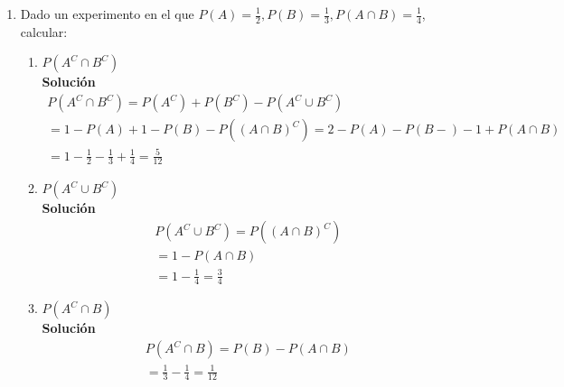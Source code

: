 \begin{enumerate}
    \item Dado un experimento en el que $P(A) = \frac{1}{2}, P(B) = \frac{1}{3}, P(A \cap B) = \frac{1}{4}$, calcular:
    \begin{enumerate}
        \item $P(A^C \cap B^C)$
        \\\textbf{Solución}
        \begin{gather*}
        P(A^C \cap B^C) = P(A^C) + P(B^C) - P(A^C \cup B^C) \\
        = 1 - P(A) + 1 - P(B) - P((A \cap B)^C) = 2 - P(A) - P(B-) - 1 + P(A \cap B) \\
        = 1 - \frac{1}{2} - \frac{1}{3} + \frac{1}{4} = \frac{5}{12}
        \end{gather*}
        
        \item $P(A^C \cup B^C)$
        \\\textbf{Solución}
        \begin{gather*}
        P(A^C \cup B^C) = P((A \cap B)^C) \\
        = 1 - P(A \cap B) \\
        = 1 - \frac{1}{4} = \frac{3}{4}
        \end{gather*}
        
        \item $P(A^C \cap B)$
        \\\textbf{Solución}
        \begin{gather*}
        P(A^C \cap B) = P(B) - P(A \cap B) \\
        = \frac{1}{3} - \frac{1}{4} = \frac{1}{12}
        \end{gather*}
        
    \end{enumerate}
    

\end{enumerate}
